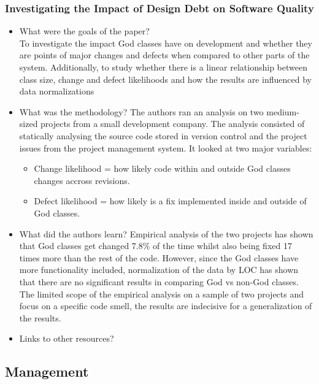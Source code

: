 \documentclass{mprop}
\begin{document}
\subsubsection{Investigating the Impact of Design Debt on Software Quality} \cite{Zazworka2011}

\begin{itemize}
	\item What were the goals of the paper? \\
	To investigate the impact God classes have on development and whether they are points of major changes and defects when compared to other parts of the system. Additionally, to study whether there is a linear relationship between class size, change and defect likelihoods and how the results are influenced by data normalizations

	\item What was the methodology?
	The authors ran an analysis on two medium-sized projects from a small development company. The analysis consisted of statically analysing the source code stored in version control and the project issues from the project management system.
	It looked at two major variables:
		\begin{itemize}
			\item Change likelihood = how likely code within and outside God classes changes accross revisions.
			\item Defect likelihood = how likely is a fix implemented inside and outside of God classes.
		\end{itemize}
	\item What did the authors learn?
	Empirical analysis of the two projects has shown that God classes get changed 7.8\% of the time whilst also being fixed 17 times more than the rest of the code.
	However, since the God classes have more functionality included, normalization of the data by LOC has shown that there are no significant results in comparing God vs non-God classes.
	The limited scope of the empirical analysis on a sample of two projects and focus on a specific code smell, the results are indecisive for a generalization of the results.
	\item Links to other resources?
\end{itemize}


\subsection{Management}
\end{document}
